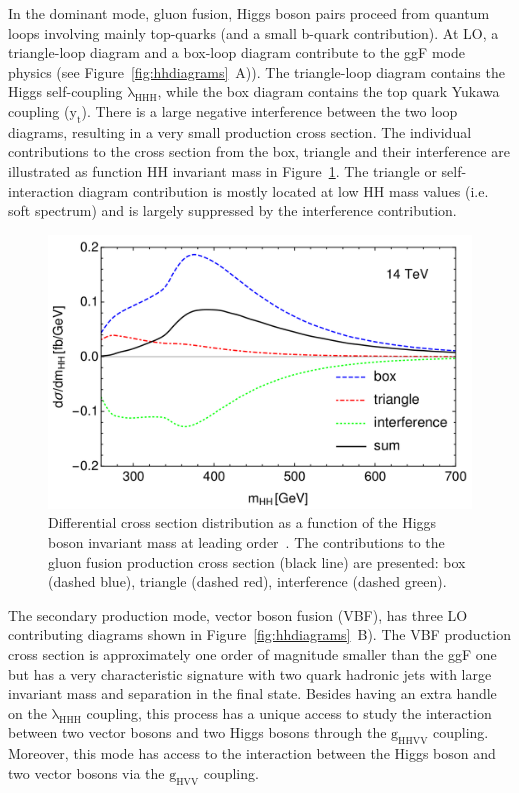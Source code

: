 In the dominant mode, gluon fusion, Higgs boson pairs proceed from quantum loops involving mainly top-quarks (and a small b-quark contribution). At LO, a triangle-loop diagram and a box-loop diagram contribute to the ggF mode physics (see Figure~\ref{fig:hhdiagrams}~A)). The triangle-loop diagram contains the Higgs self-coupling $\mathrm{\lambda_{HHH}}$, while the box diagram contains the top quark Yukawa coupling ($\mathrm{y_{t}}$). There is a large negative interference between the two loop diagrams, resulting in a very small production cross section. The individual contributions to the cross section from the box, triangle and their interference are illustrated as function HH invariant mass in Figure~\ref{fig:hhmcont}. The triangle or self-interaction diagram contribution is mostly located at low HH mass values (i.e. soft spectrum) and is largely suppressed by the interference contribution.

\begin{figure}[htp!]
\centering
\includegraphics[width=1.0\textwidth]{Figures/HiggsPairProduction/mhhcont.png}
\caption[Differential cross section distribution as a function of the Higgs boson invariant mass]{Differential cross section distribution as a function of the Higgs boson invariant mass at leading order~\cite{DiMicco:2019ngk}. The contributions to the gluon fusion production cross section (black line) are presented: box (dashed blue), triangle (dashed red), interference (dashed green).}
\label{fig:hhmcont}
\end{figure}

The secondary production mode, vector boson fusion (VBF), has three LO contributing diagrams shown in Figure~\ref{fig:hhdiagrams}~B). The VBF production cross section is approximately one order of magnitude smaller than the ggF one but has a very characteristic signature with two quark hadronic jets with large invariant mass and separation in the final state. Besides having an extra handle on the $\mathrm{\lambda_{HHH}}$ coupling, this process has a unique access to study the interaction between two vector bosons and two Higgs bosons through the $\mathrm{g_{HHVV}}$ coupling. Moreover, this mode has access to the interaction between the Higgs boson and two vector bosons via the $\mathrm{g_{HVV}}$ coupling. 

